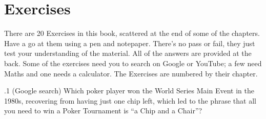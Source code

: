 
\section*{Exercises}

There are 20 Exercises in this book, scattered at the end of some of
the chapters. Have a go at them using a pen and notepaper. There's no
pass or fail, they just test your understanding of the material. All
of the answers are provided at the back. Some of the exercises need
you to search on Google or YouTube; a few need Maths and one needs a
calculator. The Exercises are numbered by their chapter.

.1 (Google search) Which poker player won the World
Series Main Event in the 1980s, recovering from having just one chip
left, which led to the phrase that all you need to win a Poker
Tournament is ``a Chip and a Chair''?

